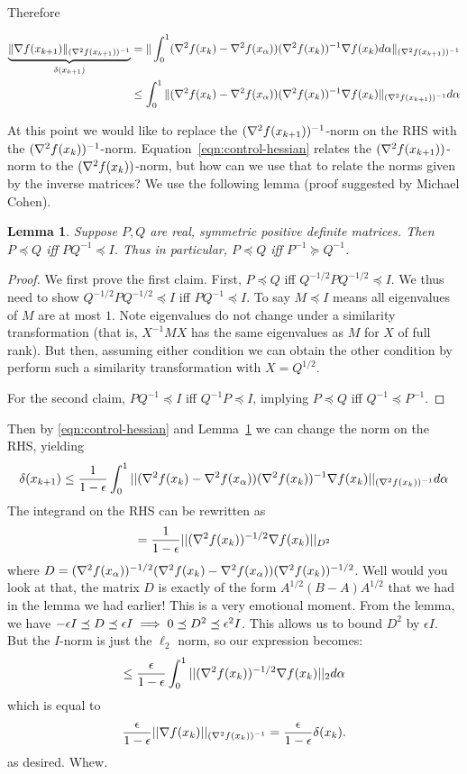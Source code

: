 \documentclass[11pt]{article}
\newtheorem{lemma}{Lemma}
\begin{document}
Therefore

\begin{align*}
\underbrace{\|\nabla f(x_{k+1})\|_{(\nabla^2 f(x_{k+1}))^{-1}}}_{\delta(x_{k+1})} &= \|\int_0^1 (\nabla^2 f(x_k) - \nabla^2 f(x_\alpha))(\nabla^2 f(x_k))^{-1}\nabla f(x_k) d\alpha\|_{(\nabla^2 f(x_{k+1}))^{-1}}\\
{}&\le \int_0^1\|(\nabla^2 f(x_k) - \nabla^2 f(x_\alpha))(\nabla^2 f(x_k))^{-1}\nabla f(x_k)\|_{(\nabla^2 f(x_{k+1}))^{-1}} d\alpha
\end{align*}

At this point we would like to replace the $(\nabla^2 f(x_{k+1}))^{-1}$-norm on the RHS with the $(\nabla^2 f(x_{k}))^{-1}$-norm. Equation~\eqref{eqn:control-hessian} relates the $(\nabla^2 f(x_{k+1}))$-norm to the $(\nabla^2 f(x_{k}))$-norm, but how can we use that to relate the norms given by the inverse matrices? We use the following lemma (proof suggested by Michael Cohen).

\begin{lemma}\label{lem:invert}
Suppose $P, Q$ are real, symmetric positive definite matrices. Then $P\preceq Q$ iff $PQ^{-1}\preceq I$. Thus in particular, $P\preceq Q$ iff $P^{-1}\succeq Q^{-1}$.
\end{lemma}
\begin{proof}
We first prove the first claim. First, $P\preceq Q$ iff $Q^{-1/2} P Q^{-1/2} \preceq I$. We thus need to show $Q^{-1/2} P Q^{-1/2} \preceq I$ iff $PQ^{-1} \preceq I$. To say $M\preceq I$ means all eigenvalues of $M$ are at most $1$. Note eigenvalues do not change under a similarity transformation (that is, $X^{-1} M X$ has the same eigenvalues as $M$ for $X$ of full rank). But then, assuming either condition we can obtain the other condition by perform such a similarity transformation with $X = Q^{1/2}$.

For the second claim, $PQ^{-1}\preceq I$ iff $Q^{-1}P\preceq I$, implying $P\preceq Q$ iff $Q^{-1}\preceq P^{-1}$.
\end{proof}

Then by \eqref{eqn:control-hessian} and Lemma~\ref{lem:invert} we can change the norm on the RHS, yielding
$$\delta(x_{k+1}) \leq \frac{1}{1-\epsilon} \int_0^1 ||(\nabla^2 f(x_k) - \nabla^2 f(x_\alpha))(\nabla^2 f(x_k))^{-1}\nabla f(x_k)||_{(\nabla^2 f(x_k))^{-1}}d\alpha$$
The integrand on the RHS can be rewritten as
\[
= \frac{1}{1-\epsilon} ||(\nabla^2 f(x_k))^{-1/2}\nabla f(x_k)||_{D^2}
\]
where $D = (\nabla^2 f(x_\alpha))^{-1/2}(\nabla^2 f(x_k) - \nabla^2 f(x_\alpha))(\nabla^2 f(x_k))^{-1/2}$. Well would you look at that, the matrix $D$ is exactly of the form $A^{1/2}(B-A)A^{1/2}$ that we had in the lemma we had earlier! This is a very emotional moment. From the lemma, we have $-\epsilon I \preceq D \preceq \epsilon I \implies 0 \preceq D^2 \preceq \epsilon^2 I$. This allows us to bound $D^2$ by $\epsilon I$. But the $I$-norm is just the $\ell_2$ norm, so our expression becomes:
\[
\leq \frac{\epsilon}{1-\epsilon} \int_0^1 || (\nabla^2 f(x_k))^{-1/2} \nabla f(x_k)||_2 d\alpha
\]
which is equal to
\[
\frac{\epsilon}{1-\epsilon} ||\nabla f(x_k)||_{(\nabla^2 f(x_k))^{-1}} = \frac{\epsilon}{1-\epsilon} \delta(x_k).
\]
as desired. Whew.
\end{document}
